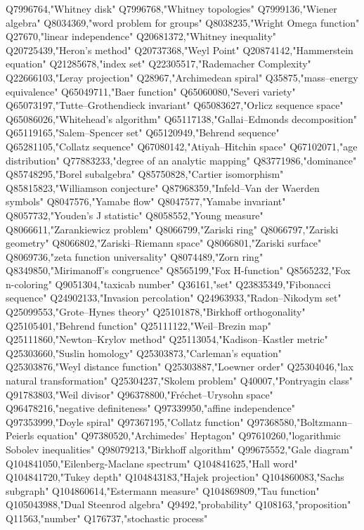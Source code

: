 Q7996764,"Whitney disk"
Q7996768,"Whitney topologies"
Q7999136,"Wiener algebra"
Q8034369,"word problem for groups"
Q8038235,"Wright Omega function"
Q27670,"linear independence"
Q20681372,"Whitney inequality"
Q20725439,"Heron's method"
Q20737368,"Weyl Point"
Q20874142,"Hammerstein equation"
Q21285678,"index set"
Q22305517,"Rademacher Complexity"
Q22666103,"Leray projection"
Q28967,"Archimedean spiral"
Q35875,"mass–energy equivalence"
Q65049711,"Baer function"
Q65060080,"Severi variety"
Q65073197,"Tutte–Grothendieck invariant"
Q65083627,"Orlicz sequence space"
Q65086026,"Whitehead's algorithm"
Q65117138,"Gallai–Edmonds decomposition"
Q65119165,"Salem–Spencer set"
Q65120949,"Behrend sequence"
Q65281105,"Collatz sequence"
Q67080142,"Atiyah–Hitchin space"
Q67102071,"age distribution"
Q77883233,"degree of an analytic mapping"
Q83771986,"dominance"
Q85748295,"Borel subalgebra"
Q85750828,"Cartier isomorphism"
Q85815823,"Williamson conjecture"
Q87968359,"Infeld–Van der Waerden symbols"
Q8047576,"Yamabe flow"
Q8047577,"Yamabe invariant"
Q8057732,"Youden's J statistic"
Q8058552,"Young measure"
Q8066611,"Zarankiewicz problem"
Q8066799,"Zariski ring"
Q8066797,"Zariski geometry"
Q8066802,"Zariski–Riemann space"
Q8066801,"Zariski surface"
Q8069736,"zeta function universality"
Q8074489,"Zorn ring"
Q8349850,"Mirimanoff's congruence"
Q8565199,"Fox H-function"
Q8565232,"Fox n-coloring"
Q9051304,"taxicab number"
Q36161,"set"
Q23835349,"Fibonacci sequence"
Q24902133,"Invasion percolation"
Q24963933,"Radon–Nikodym set"
Q25099553,"Grote–Hynes theory"
Q25101878,"Birkhoff orthogonality"
Q25105401,"Behrend function"
Q25111122,"Weil–Brezin map"
Q25111860,"Newton–Krylov method"
Q25113054,"Kadison–Kastler metric"
Q25303660,"Suslin homology"
Q25303873,"Carleman's equation"
Q25303876,"Weyl distance function"
Q25303887,"Loewner order"
Q25304046,"lax natural transformation"
Q25304237,"Skolem problem"
Q40007,"Pontryagin class"
Q91783803,"Weil divisor"
Q96378800,"Fréchet–Urysohn space"
Q96478216,"negative definiteness"
Q97339950,"affine independence"
Q97353999,"Doyle spiral"
Q97367195,"Collatz function"
Q97368580,"Boltzmann–Peierls equation"
Q97380520,"Archimedes' Heptagon"
Q97610260,"logarithmic Sobolev inequalities"
Q98079213,"Birkhoff algorithm"
Q99675552,"Gale diagram"
Q104841050,"Eilenberg-Maclane spectrum"
Q104841625,"Hall word"
Q104841720,"Tukey depth"
Q104843183,"Hajek projection"
Q104860083,"Sachs subgraph"
Q104860614,"Estermann measure"
Q104869809,"Tau function"
Q105043988,"Dual Steenrod algebra"
Q9492,"probability"
Q108163,"proposition"
Q11563,"number"
Q176737,"stochastic process"
